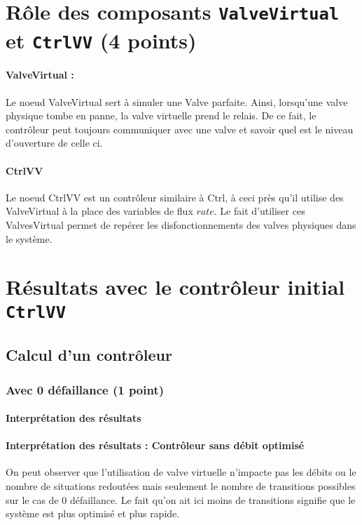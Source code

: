 \documentclass[a4paper]{book}
\begin{document}
\section{Rôle des composants {\tt ValveVirtual} et {\tt CtrlVV} (4 points)}
\paragraph{ValveVirtual : }
Le noeud ValveVirtual sert à simuler une Valve parfaite. Ainsi, lorsqu'une valve physique tombe en panne, la valve virtuelle prend le relais. De ce fait, le contrôleur peut toujours communiquer avec une valve et savoir quel est le niveau d'ouverture de celle ci.

\paragraph{CtrlVV}
Le noeud CtrlVV est un contrôleur similaire à Ctrl, à ceci près qu'il utilise des ValveVirtual à la place des variables de flux $rate$.
Le fait d'utiliser ces ValvesVirtual permet de repérer les disfonctionnements des valves physiques dans le système.

\section{Résultats avec le contrôleur initial {\tt CtrlVV}}
\subsection{Calcul d'un contrôleur}
\subsubsection{Avec 0 défaillance (1 point)}


%
%
%
\paragraph{Interprétation des résultats}
\paragraph{Interprétation des résultats : Contrôleur sans débit optimisé}
On peut observer que l'utilisation de valve virtuelle n'impacte pas les débits ou le nombre de situations redoutées mais seulement le nombre de transitions possibles sur le cas de 0 défaillance.
Le fait qu'on ait ici moins de transitions signifie que le système est plus optimisé et plus rapide.
\end{document}
